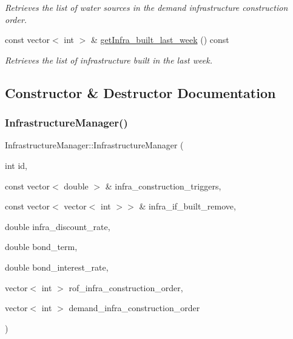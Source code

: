 \begin{DoxyCompactItemize}
\begin{DoxyCompactList}\small\item\em Retrieves the list of water sources in the demand infrastructure construction order. \end{DoxyCompactList}\item 
const vector$<$ int $>$ \& \mbox{\hyperlink{classInfrastructureManager_a540f233692981645d52af7f1de087dbf}{get\+Infra\+\_\+built\+\_\+last\+\_\+week}} () const
\begin{DoxyCompactList}\small\item\em Retrieves the list of infrastructure built in the last week. \end{DoxyCompactList}\end{DoxyCompactItemize}


\subsection{Constructor \& Destructor Documentation}
\mbox{\label{classInfrastructureManager_a2720f467b660e0f63f265e7957ca0139}} 
\subsubsection{\texorpdfstring{Infrastructure\+Manager()}{InfrastructureManager()}\hspace{0.1cm}{\footnotesize\ttfamily [1/3]}}
{\footnotesize\ttfamily Infrastructure\+Manager\+::\+Infrastructure\+Manager (\begin{DoxyParamCaption}\item[{int}]{id,  }\item[{const vector$<$ double $>$ \&}]{infra\+\_\+construction\+\_\+triggers,  }\item[{const vector$<$ vector$<$ int $>$$>$ \&}]{infra\+\_\+if\+\_\+built\+\_\+remove,  }\item[{double}]{infra\+\_\+discount\+\_\+rate,  }\item[{double}]{bond\+\_\+term,  }\item[{double}]{bond\+\_\+interest\+\_\+rate,  }\item[{vector$<$ int $>$}]{rof\+\_\+infra\+\_\+construction\+\_\+order,  }\item[{vector$<$ int $>$}]{demand\+\_\+infra\+\_\+construction\+\_\+order }\end{DoxyParamCaption})}



